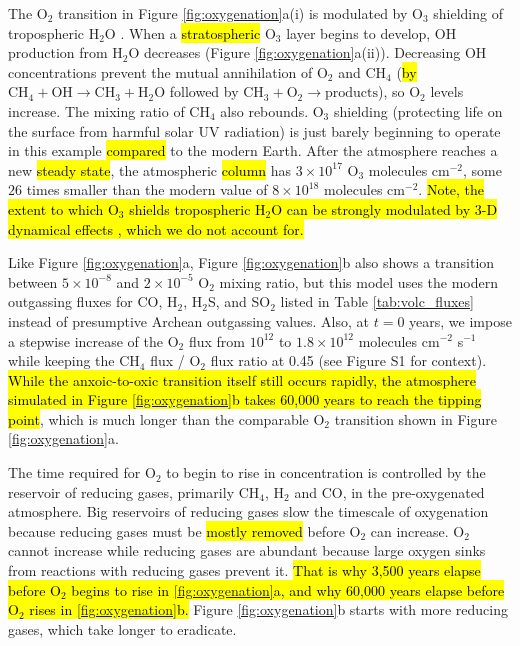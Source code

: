 \documentclass[9pt,twocolumn,twoside,lineno]{pnas-new}
\begin{document}
The O$_2$ transition in Figure \ref{fig:oxygenation}a(i) is modulated by O$_3$ shielding of tropospheric H$_2$O \cite{Kasting_1980}. When a \hl{stratospheric} O$_3$ layer begins to develop, OH production from H$_2$O decreases (Figure \ref{fig:oxygenation}a(ii)). Decreasing OH concentrations prevent the mutual annihilation of O$_2$ and CH$_4$ (\hl{by} $\mathrm{CH_4} + \mathrm{OH} \rightarrow \mathrm{CH_3} + \mathrm{H_2O}$ followed by $\mathrm{CH_3} + \mathrm{O_2} \rightarrow \text{products}$), so O$_2$ levels increase. The mixing ratio of CH$_4$ also rebounds. O$_3$ shielding (protecting life on the surface from harmful solar UV radiation) is just barely beginning to operate in this example \hl{compared} to the modern Earth. After the atmosphere reaches a new \hl{steady state}, the atmospheric \hl{column} has $3 \times 10^{17}$ O$_3$ molecules cm$^{-2}$, some $26$ times smaller than the modern value of $8 \times 10^{18}$ molecules cm$^{-2}$. \hl{Note, the extent to which O$_3$ shields tropospheric H$_2$O can be strongly modulated by 3-D dynamical effects \mbox{\cite{Cooke_2022}}, which we do not account for.}

Like Figure \ref{fig:oxygenation}a, Figure \ref{fig:oxygenation}b also shows a transition between $5 \times 10^{-8}$ and $2 \times 10^{-5}$ O$_2$ mixing ratio, but this model uses the modern outgassing fluxes for CO, H$_2$, H$_2$S, and SO$_2$ listed in Table \ref{tab:volc_fluxes} instead of presumptive Archean outgassing values. Also, at $t = 0$ years, we impose a stepwise increase of the O$_2$ flux from $10^{12}$ to $1.8 \times 10^{12}$ molecules cm$^{-2}$ s$^{-1}$ while keeping the CH$_4$ flux / O$_2$ flux ratio at 0.45 (see Figure S1 for context). \hl{While the anxoic-to-oxic transition itself still occurs rapidly, the atmosphere simulated in Figure \mbox{\ref{fig:oxygenation}}b takes 60,000 years to reach the tipping point}, which is much longer than the comparable O$_2$ transition shown in Figure \ref{fig:oxygenation}a.

The time required for O$_2$ to begin to rise in concentration is controlled by the reservoir of reducing gases, primarily CH$_4$, H$_2$ and CO, in the pre-oxygenated atmosphere. Big reservoirs of reducing gases slow the timescale of oxygenation because reducing gases must be \hl{mostly removed} before O$_2$ can increase. O$_2$ cannot increase while reducing gases are abundant because large oxygen sinks from reactions with reducing gases prevent it. \hl{That is why 3,500 years elapse before O$_2$ begins to rise in \mbox{\ref{fig:oxygenation}}a, and why 60,000 years elapse before O$_2$ rises in \mbox{\ref{fig:oxygenation}}b.} Figure \ref{fig:oxygenation}b starts with more reducing gases, which take longer to eradicate.
\end{document}
